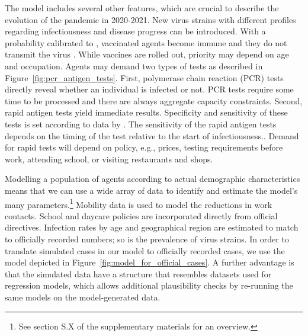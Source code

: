 The model includes several other features, which are crucial to describe the evolution of
the pandemic in 2020-2021. New virus strains with different profiles regarding
infectiousness and disease progress can be introduced. With a probability calibrated to
\cite{Hunter2021}, vaccinated agents become immune and they do not transmit the virus
\citep{Petter2021, LevineTiefenbrun2021, Pritchard2021}.%
While vaccines are rolled out, priority may depend on age and occupation. Agents may
demand two types of tests as described in Figure~\ref{fig:pcr_antigen_tests}. First,
polymerase chain reaction (PCR) tests directly reveal whether an individual is infected
or not. PCR tests require some time to be processed and there are always aggregate
capacity constraints. Second, rapid antigen tests yield immediate results. Specificity
and sensitivity of these tests is set according to data by \cite{Bruemmer2021, Smith2021}
. The sensitivity of the rapid antigen tests depends on the timing of the test relative
to the start of infectiousness.. Demand for rapid tests will depend on policy, e.g., prices, testing
requirements before work, attending school, or visiting restaurants and shops.

Modelling a population of agents according to actual demographic characteristics means
that we can use a wide array of data to identify and estimate the model's many
parameters.\footnote{See section S.X of the supplementary materials for an
overview.} Mobility data is used to
model the reductions in work contacts. School and daycare policies are incorporated
directly from official directives. Infection rates by age and geographical region are
estimated to match to officially recorded numbers; so is the prevalence of virus strains.
In order to translate simulated cases in our model to officially recorded cases, we use
the model depicted in Figure~\ref{fig:model_for_official_cases}.  A further advantage is that the simulated data have a structure that resembles
datasets used for regression models, which allows additional plausibility checks by
re-running the same models on the model-generated data.

